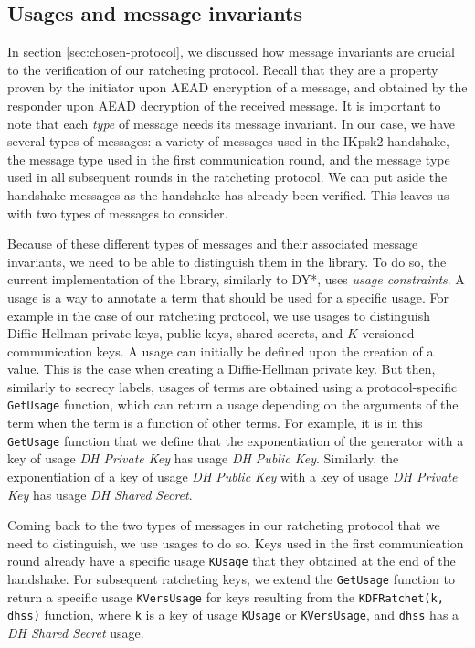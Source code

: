 \subsection{Usages and message invariants}
\label{sec:usages-and-message-invariants}

In section \ref{sec:chosen-protocol}, we discussed how message invariants are crucial to the verification of our ratcheting protocol.
Recall that they are a property proven by the initiator upon AEAD encryption of a message, and obtained by the responder upon AEAD decryption of the received message.
It is important to note that each \emph{type} of message needs its message invariant.
In our case, we have several types of messages: a variety of messages used in the IKpsk2 handshake, the message type used in the first communication round, and the message type used in all subsequent rounds in the ratcheting protocol.
We can put aside the handshake messages as the handshake has already been verified.
This leaves us with two types of messages to consider.

Because of these different types of messages and their associated message invariants, we need to be able to distinguish them in the library.
To do so, the current implementation of the library, similarly to DY*, uses \emph{usage constraints}.
A usage is a way to annotate a term that should be used for a specific usage.
For example in the case of our ratcheting protocol, we use usages to distinguish Diffie-Hellman private keys, public keys, shared secrets, and $K$ versioned communication keys.
A usage can initially be defined upon the creation of a value. This is the case when creating a Diffie-Hellman private key.
But then, similarly to secrecy labels, usages of terms are obtained using a protocol-specific \texttt{GetUsage} function, which can return a usage depending on the arguments of the term when the term is a function of other terms.
For example, it is in this \texttt{GetUsage} function that we define that the exponentiation of the generator with a key of usage \emph{DH Private Key} has usage \emph{DH Public Key}.
Similarly, the exponentiation of a key of usage \emph{DH Public Key} with a key of usage \emph{DH Private Key} has usage \emph{DH Shared Secret}.

Coming back to the two types of messages in our ratcheting protocol that we need to distinguish, we use usages to do so.
Keys used in the first communication round already have a specific usage \texttt{KUsage} that they obtained at the end of the handshake.
For subsequent ratcheting keys, we extend the \texttt{GetUsage} function to return a specific usage \texttt{KVersUsage} for keys resulting from the \texttt{KDFRatchet(k, dhss)} function, where \texttt{k} is a key of usage \texttt{KUsage} or \texttt{KVersUsage}, and \texttt{dhss} has a \emph{DH Shared Secret} usage.

